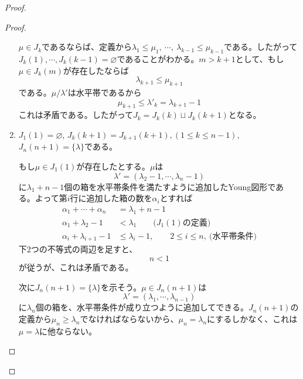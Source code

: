 \documentclass{ltjsreport}
\begin{document}
\begin{proof}
\begin{proof}
\begin{enumerate}
            $\mu\in J_k$であるならば、定義から$\lambda_1\leq \mu_1,\:\cdots,\:\lambda_{k-1}\leq\mu_{k-1}$である。したがって$J_k(1),\cdots,J_k(k-1)=\varnothing$であることがわかる。$m>k+1$として、もし$\mu\in J_k(m)$が存在したならば
            \[
            \lambda_{k+1}\leq \mu_{k+1}    
            \]
            である。$\mu/\lambda'$は水平帯であるから
            \[
            \mu_{k+1}\leq \lambda'_{k}=\lambda_{k+1}-1 
            \]
            これは矛盾である。したがって$J_k=J_k(k)\sqcup J_k(k+1)$となる。

            \item $J_1(1)=\varnothing$, $J_k(k+1)=J_{k+1}(k+1),(1\leq k\leq n-1)$, $J_n(n+1)=\{\lambda\}$である。
            
            もし$\mu\in J_1(1)$が存在したとする。$\mu$は
            \[
            \lambda'=(\lambda_2-1,\cdots,\lambda_n-1)    
            \]
            に$\lambda_1+n-1$個の箱を水平帯条件を満たすように追加したYoung図形である。よって第$i$行に追加した箱の数を$\alpha_i$とすれば
            \begin{align*}
                \alpha_1+\cdots+\alpha_{n}&=\lambda_1+n-1\\
                \alpha_1+\lambda_2-1&<\lambda_1\qquad\text{($J_1(1)$の定義)}\\
                \alpha_{i}+\lambda_{i+1}-1&\leq \lambda_{i}-1,\qquad2\leq i\leq n,\:\text{(水平帯条件)}
            \end{align*}
            下$2$つの不等式の両辺を足すと、
            \[
            n< 1
            \]
            が従うが、これは矛盾である。

            次に$J_n(n+1)=\{\lambda\}$を示そう。$\mu\in J_n(n+1)$は
            \[
            \lambda'=(\lambda_1,\cdots,\lambda_{n-1})    
            \]
            に$\lambda_n$個の箱を、水平帯条件が成り立つように追加してできる。$J_n(n+1)$の定義から$\mu_n\geq \lambda_n$でなければならないから、$\mu_n=\lambda_n$にするしかなく、これは$\mu=\lambda$に他ならない。


\end{enumerate}
\end{proof}
\end{proof}
\end{document}
